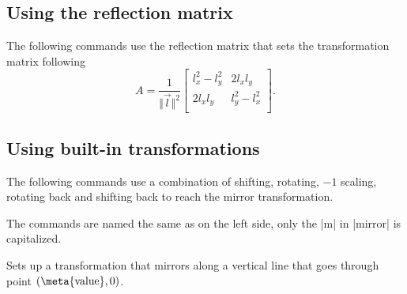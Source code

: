 \begin{paracol}{2}

\subsection{Using the reflection matrix}

The following commands use the reflection matrix that sets the transformation matrix following
\begin{equation*}
  A = \frac{1}{\Vert\vec l\Vert^2} \begin{bmatrix}
  l_x^2-l_y^2 & 2l_xl_y \\
  2l_xl_y & l_y^2-l_x^2\\
  \end{bmatrix}.
\end{equation*}

\switchcolumn%

\subsection{Using built-in transformations}

The following commands use a combination of shifting, rotating, $-1$ scaling,
rotating back and shifting back to reach the mirror transformation.

The commands are named the same as on the left side,
only the |m| in |mirror| is capitalized.

\switchcolumn*%

\begin{command}{\pgfexttransformxmirror{}}\cmdcompat\pgftransformxmirror
  Sets up a transformation that mirrors along a vertical line that goes through point $(\text{\meta{value}}, 0)$.

\begin{codeexample}[preamble=\usepgflibrary{ext.transformations.mirror}]
\end{codeexample}
\end{command}

\switchcolumn%


\end{paracol}
